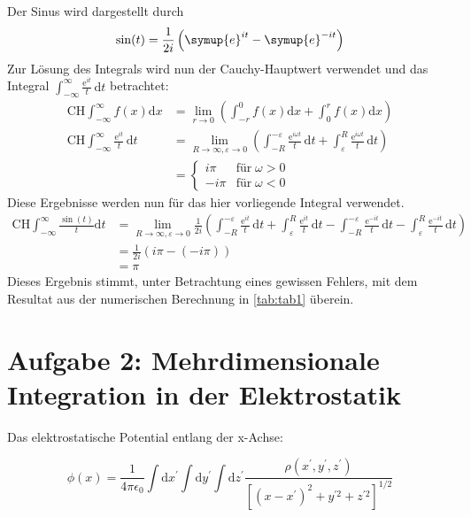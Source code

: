 Der Sinus wird dargestellt durch
\begin{equation*}
  \sin (t) = \frac{1}{2i} \left(\symup{e}^{it}-\symup{e}^{-it}\right)
\end{equation*}
Zur Lösung des Integrals wird nun der Cauchy-Hauptwert verwendet und das Integral $\int_{-\infty}^{\infty} \frac{\text{e}^{it}}{t} \, \text{d} t$
betrachtet:
\begin{align*}
  \text{CH} \int_{-\infty}^{\infty} f(x) \text{d} x &= \lim_{r \to 0} \left(\int_{-r}^{0}f(x) \text{d} x  + \int_{0}^{r}f(x) \text{d} x\right) \\
  \text{CH} \int_{-\infty}^{\infty} \frac{\text{e}^{it}}{t} \, \text{d} t &= \lim_{R \to \infty, \varepsilon \to 0} \left(\int_{-R}^{-\varepsilon} \frac{\text{e}^{i \omega t}}{t} \, \text{d} t + \int_{\varepsilon}^{R} \frac{\text{e}^{i \omega t}}{t} \, \text{d} t \right) \\
  &= \begin{cases}
  i \pi   & \text{für} \; \omega > 0 \\
  -i \pi  & \text{für} \; \omega < 0
      \end{cases}
\end{align*}
Diese Ergebnisse werden nun für das hier vorliegende Integral verwendet.
\begin{align*}
  \text{CH} \int_{-\infty}^{\infty} \frac{\sin (t)}{t} \text{d} t &= \lim_{R \to \infty, \varepsilon \to 0} \frac{1}{2i} \left(\int_{-R}^{-\varepsilon} \frac{\text{e}^{i t}}{t} \, \text{d} t + \int_{\varepsilon}^{R} \frac{\text{e}^{i t}}{t} \, \text{d} t - \int_{-R}^{-\varepsilon} \frac{\text{e}^{-i t}}{t} \, \text{d} t - \int_{\varepsilon}^{R} \frac{\text{e}^{-i t}}{t} \, \text{d} t \right) \\
  &= \frac{1}{2 i} \left(i \pi - \left(-i \pi\right)\right) \\
  &= \pi
\end{align*}
Dieses Ergebnis stimmt, unter Betrachtung eines gewissen Fehlers, mit dem Resultat aus der numerischen Berechnung in \ref{tab:tab1} überein.
\section*{Aufgabe 2: Mehrdimensionale Integration in der Elektrostatik}
Das elektrostatische Potential entlang der x-Achse:

\begin{equation*}
  \phi(x)=\frac{1}{4 \pi \epsilon_{0}} \int \mathrm{d} x^{\prime} \int \mathrm{d} y^{\prime} \int \mathrm{d} z^{\prime} \frac{\rho\left(x^{\prime}, y^{\prime}, z^{\prime}\right)}{\left[\left(x-x^{\prime}\right)^{2}+y^{\prime 2}+z^{\prime 2}\right]^{1 / 2}}
\end{equation*}

